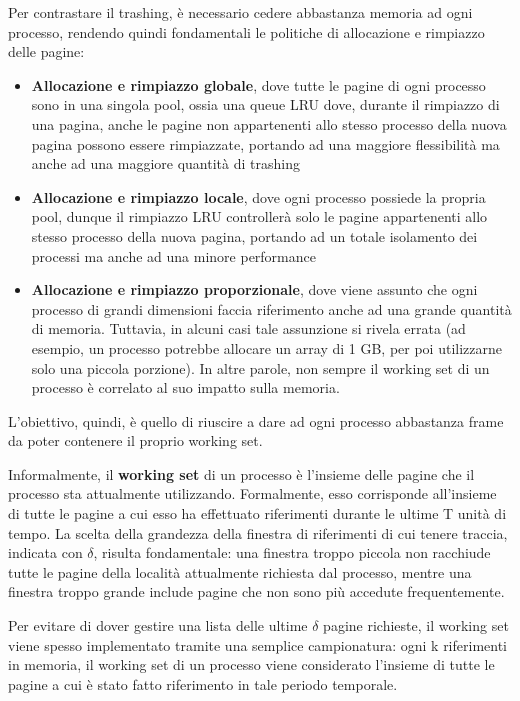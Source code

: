 \documentclass{article}
\begin{document}
Per contrastare il trashing, è necessario cedere abbastanza memoria ad ogni processo, rendendo quindi fondamentali le politiche di allocazione e rimpiazzo delle pagine:
\begin{itemize}
    \item \textbf{Allocazione e rimpiazzo globale}, dove tutte le pagine di ogni processo sono in una singola pool, ossia una queue LRU dove, durante il rimpiazzo di una pagina, anche le pagine non appartenenti allo stesso processo della nuova pagina possono essere rimpiazzate, portando ad una maggiore flessibilità ma anche ad una maggiore quantità di trashing
    \item \textbf{Allocazione e rimpiazzo locale}, dove ogni processo possiede la propria pool, dunque il rimpiazzo LRU controllerà solo le pagine appartenenti allo stesso processo della nuova pagina, portando ad un totale isolamento dei processi ma anche ad una minore performance
    \item \textbf{Allocazione e rimpiazzo proporzionale}, dove viene assunto che ogni processo di grandi dimensioni faccia riferimento anche ad una grande quantità di memoria. Tuttavia, in alcuni casi tale assunzione si rivela errata (ad esempio, un processo potrebbe allocare un array di 1 GB, per poi utilizzarne solo una piccola porzione). In altre parole, non sempre il working set di un processo è correlato al suo impatto sulla memoria.
\end{itemize}
L'obiettivo, quindi, è quello di riuscire a dare ad ogni processo abbastanza frame da poter contenere il proprio working set.

Informalmente, il \textbf{working set} di un processo è l'insieme delle pagine che il processo sta attualmente utilizzando. Formalmente, esso corrisponde all'insieme di tutte le pagine a cui esso ha effettuato riferimenti durante le ultime T unità di tempo.
La scelta della grandezza della finestra di riferimenti di cui tenere traccia, indicata con $\delta$, risulta fondamentale: una finestra troppo piccola non racchiude tutte le pagine della località attualmente richiesta dal processo, mentre una finestra troppo grande include pagine che non sono più accedute frequentemente.\par
Per evitare di dover gestire una lista delle ultime $\delta$ pagine richieste, il working set viene spesso implementato tramite una semplice campionatura: ogni k riferimenti in memoria, il working set di un processo viene considerato l'insieme di tutte le pagine a cui è stato fatto riferimento in tale periodo temporale.
\end{document}
